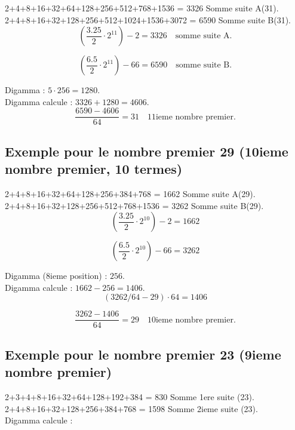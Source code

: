 \documentclass[a4paper,11pt]{article}
\begin{document}
2+4+8+16+32+64+128+256+512+768+1536 = 3326 Somme suite A(31).\\
2+4+8+16+32+128+256+512+1024+1536+3072 = 6590 Somme suite B(31).\\

\[
\left(\frac{3.25}{2} \cdot 2^{11}\right) - 2 = 3326 \quad \text{somme suite A.}
\]

\[
\left(\frac{6.5}{2} \cdot 2^{11}\right) - 66 = 6590 \quad \text{somme suite B.}
\]

Digamma : \(5 \cdot 256 = 1280\).\\
Digamma calcule : \(3326 + 1280 = 4606\).\\

\[
\frac{6590 - 4606}{64} = 31 \quad \text{11ieme nombre premier.}
\]

\bigskip

\subsection*{Exemple pour le nombre premier 29 (10ieme nombre premier, 10 termes)}

2+4+8+16+32+64+128+256+384+768 = 1662 Somme suite A(29).\\
2+4+8+16+32+128+256+512+768+1536 = 3262 Somme suite B(29).\\

\[
\left(\frac{3.25}{2} \cdot 2^{10}\right) - 2 = 1662
\]

\[
\left(\frac{6.5}{2} \cdot 2^{10}\right) - 66 = 3262
\]

Digamma (8ieme position) : \(256\).\\
Digamma calcule : \(1662 - 256 = 1406\).\\

\[
(3262/64 - 29) \cdot 64 = 1406
\]

\[
\frac{3262 - 1406}{64} = 29 \quad \text{10ieme nombre premier.}
\]

\bigskip

\subsection*{Exemple pour le nombre premier 23 (9ieme nombre premier)}

2+3+4+8+16+32+64+128+192+384 = 830 Somme 1ere suite (23).\\
2+4+8+16+32+128+256+384+768 = 1598 Somme 2ieme suite (23).\\

Digamma calcule :
\end{document}
